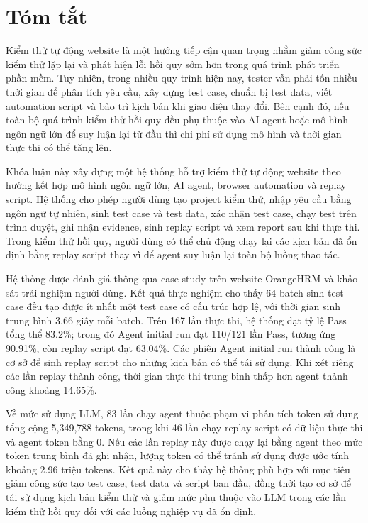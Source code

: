\chapter*{Tóm tắt}
\label{summary}

Kiểm thử tự động website là một hướng tiếp cận quan trọng nhằm giảm công sức kiểm thử lặp lại và phát hiện lỗi hồi quy sớm hơn trong quá trình phát triển phần mềm. Tuy nhiên, trong nhiều quy trình hiện nay, tester vẫn phải tốn nhiều thời gian để phân tích yêu cầu, xây dựng test case, chuẩn bị test data, viết automation script và bảo trì kịch bản khi giao diện thay đổi. Bên cạnh đó, nếu toàn bộ quá trình kiểm thử hồi quy đều phụ thuộc vào AI agent hoặc mô hình ngôn ngữ lớn để suy luận lại từ đầu thì chi phí sử dụng mô hình và thời gian thực thi có thể tăng lên.

Khóa luận này xây dựng một hệ thống hỗ trợ kiểm thử tự động website theo hướng kết hợp mô hình ngôn ngữ lớn, AI agent, browser automation và replay script. Hệ thống cho phép người dùng tạo project kiểm thử, nhập yêu cầu bằng ngôn ngữ tự nhiên, sinh test case và test data, xác nhận test case, chạy test trên trình duyệt, ghi nhận evidence, sinh replay script và xem report sau khi thực thi. Trong kiểm thử hồi quy, người dùng có thể chủ động chạy lại các kịch bản đã ổn định bằng replay script thay vì để agent suy luận lại toàn bộ luồng thao tác.

Hệ thống được đánh giá thông qua case study trên website OrangeHRM và khảo sát trải nghiệm người dùng. Kết quả thực nghiệm cho thấy 64 batch sinh test case đều tạo được ít nhất một test case có cấu trúc hợp lệ, với thời gian sinh trung bình 3.66 giây mỗi batch. Trên 167 lần thực thi, hệ thống đạt tỷ lệ Pass tổng thể 83.2\%; trong đó Agent initial run đạt 110/121 lần Pass, tương ứng 90.91\%, còn replay script đạt 63.04\%. Các phiên Agent initial run thành công là cơ sở để sinh replay script cho những kịch bản có thể tái sử dụng. Khi xét riêng các lần replay thành công, thời gian thực thi trung bình thấp hơn agent thành công khoảng 14.65\%.

Về mức sử dụng LLM, 83 lần chạy agent thuộc phạm vi phân tích token sử dụng tổng cộng 5,349,788 tokens, trong khi 46 lần chạy replay script có dữ liệu thực thi và agent token bằng 0. Nếu các lần replay này được chạy lại bằng agent theo mức token trung bình đã ghi nhận, lượng token có thể tránh sử dụng được ước tính khoảng 2.96 triệu tokens. Kết quả này cho thấy hệ thống phù hợp với mục tiêu giảm công sức tạo test case, test data và script ban đầu, đồng thời tạo cơ sở để tái sử dụng kịch bản kiểm thử và giảm mức phụ thuộc vào LLM trong các lần kiểm thử hồi quy đối với các luồng nghiệp vụ đã ổn định.
